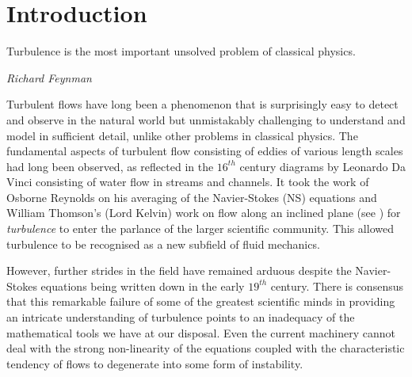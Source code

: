 
\chapter{Introduction}
\label{chap:introduction}


\epigraph{Turbulence is the most important unsolved problem of classical physics.}{\textit{Richard Feynman}}

Turbulent flows have long been a phenomenon that is surprisingly easy to detect and observe in the natural world but unmistakably challenging to understand and model in sufficient detail, unlike other problems in classical physics.
The fundamental aspects of turbulent flow consisting of eddies of various length scales had long been observed, as reflected in the $16^{th}$ century diagrams by Leonardo Da Vinci consisting of water flow in streams and channels.
It took the work of Osborne Reynolds on his averaging of the Navier-Stokes (NS) equations and William Thomson's (Lord Kelvin) work on flow along an inclined plane (see ) for \textit{turbulence} to enter the parlance of the larger scientific community. This allowed turbulence to be recognised as a new subfield of fluid mechanics.

However, further strides in the field have remained arduous despite the Navier-Stokes equations being written down in the early $19^{th}$ century. There is consensus that this remarkable failure of some of the greatest scientific minds in providing an intricate understanding of turbulence points to an inadequacy of the mathematical tools we have at our disposal. Even the current machinery cannot deal with the strong non-linearity of the equations coupled with the characteristic tendency of flows to degenerate into some form of instability.

